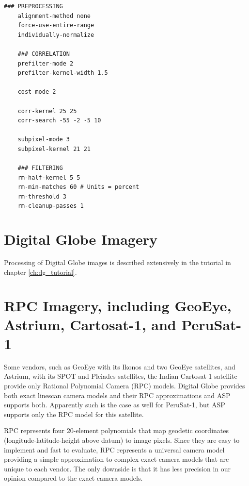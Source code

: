 \begin{center}\begin{minipage}{5.5in}
\begin{Verbatim}[frame=single,fontsize=\small,label=stereo.default for Cassini ISS]
    ### PREPROCESSING
    alignment-method none
    force-use-entire-range
    individually-normalize

    ### CORRELATION
    prefilter-mode 2
    prefilter-kernel-width 1.5

    cost-mode 2

    corr-kernel 25 25
    corr-search -55 -2 -5 10

    subpixel-mode 3
    subpixel-kernel 21 21

    ### FILTERING
    rm-half-kernel 5 5
    rm-min-matches 60 # Units = percent
    rm-threshold 3
    rm-cleanup-passes 1

\end{Verbatim}
\end{minipage}\end{center}

\section{Digital Globe Imagery}
\label{digital_globe_data}

Processing of Digital Globe images is described extensively in the
tutorial in chapter \ref{ch:dg_tutorial}.

\section{RPC Imagery, including GeoEye, Astrium, Cartosat-1, and PeruSat-1}
\label{rpc}

Some vendors, such as GeoEye with its Ikonos and two GeoEye satellites,
and Astrium, with its SPOT and Pleiades satellites, the Indian Cartosat-1 
satellite provide only
Rational Polynomial Camera (RPC) models. Digital Globe provides both
exact linescan camera models and their RPC approximations and ASP supports both. 
Apparently such is the case as well for PeruSat-1, but ASP supports only 
the RPC model for this satellite. 

RPC represents four 20-element polynomials that map geodetic coordinates
(longitude-latitude-height above datum)
to image pixels. Since they are easy to implement and fast to
evaluate, RPC represents a universal camera model providing a simple
approximation to complex exact camera models that are unique to each
vendor. The only downside is that it has less precision in our
opinion compared to the exact camera models.

